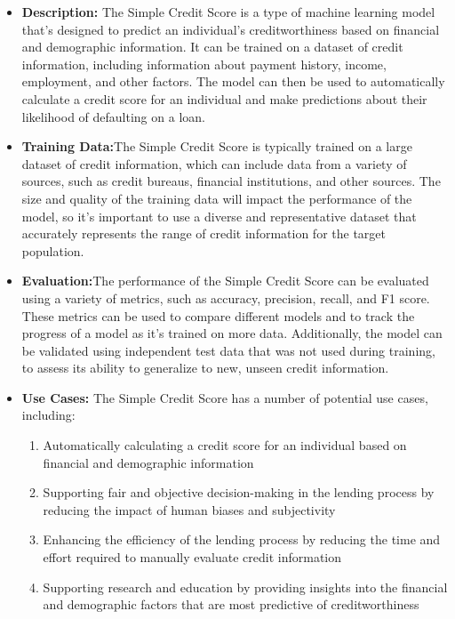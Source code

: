 \begin{itemize}
    \item \textbf{Description:} The Simple Credit Score is a type of machine learning model that's designed to predict an individual's creditworthiness based on financial and demographic information. It can be trained on a dataset of credit information, including information about payment history, income, employment, and other factors. The model can then be used to automatically calculate a credit score for an individual and make predictions about their likelihood of defaulting on a loan.
    \item \textbf{Training Data:}The Simple Credit Score is typically trained on a large dataset of credit information, which can include data from a variety of sources, such as credit bureaus, financial institutions, and other sources. The size and quality of the training data will impact the performance of the model, so it's important to use a diverse and representative dataset that accurately represents the range of credit information for the target population.
    \item \textbf{Evaluation:}The performance of the Simple Credit Score can be evaluated using a variety of metrics, such as accuracy, precision, recall, and F1 score. These metrics can be used to compare different models and to track the progress of a model as it's trained on more data. Additionally, the model can be validated using independent test data that was not used during training, to assess its ability to generalize to new, unseen credit information.
    \item \textbf{Use Cases:} The Simple Credit Score has a number of potential use cases, including:
        \begin{enumerate}  
            \item Automatically calculating a credit score for an individual based on financial and demographic information
            \item Supporting fair and objective decision-making in the lending process by reducing the impact of human biases and subjectivity
            \item Enhancing the efficiency of the lending process by reducing the time and effort required to manually evaluate credit information
            \item Supporting research and education by providing insights into the financial and demographic factors that are most predictive of creditworthiness
        \end{enumerate}

\end{itemize}
